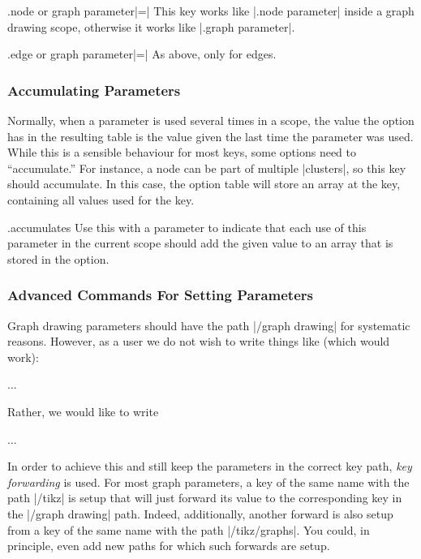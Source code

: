 \begin{handler}{{.node or graph parameter}|=|}
  This key works like |.node parameter| inside a graph drawing scope,
  otherwise it works like |.graph parameter|.
\end{handler}

\begin{handler}{{.edge or graph parameter}|=|}
  As above, only for edges.
\end{handler}


\subsubsection{Accumulating Parameters}

Normally, when a parameter is used several times in a scope, the
value the option has in the resulting table is the  value given the
last time the parameter was used. While this is a sensible behaviour
for most keys, some options need to ``accumulate.'' For instance, a
node can be part of multiple |clusters|, so this key should
accumulate. In this case, the option table will store an array at the
key, containing all values used for the key.


\begin{handler}{{.accumulates}}
  Use this with a parameter to indicate that each use of this
  parameter in the current scope should add the given value to an
  array that is stored in the option.
\end{handler}


\subsubsection{Advanced Commands For Setting Parameters}

Graph drawing parameters should have the path
|/graph drawing| for systematic reasons. However, as a user we do not
wish to write things like (which would work):
\begin{codeexample}
\tikz [/graph drawing/algorithm=my algorithm,
       /graph drawing/my algorithm/foo=bar,  
       /graph drawing/blub=foobar] ...
\end{codeexample}
Rather, we would like to write
\begin{codeexample}
\tikz [my algorithm={foo=bar}, blub=foobar] ...
\end{codeexample}

In order to achieve this and still keep the parameters in the correct
key path, \emph{key forwarding} is used. For most graph parameters, a
key of the same name with the path |/tikz| is setup that will just
forward its value to the corresponding key in the |/graph drawing|
path. Indeed, additionally, another forward is also setup from a key
of the same name with the path |/tikz/graphs|. You could, in
principle, even add new paths for which such forwards are setup.

